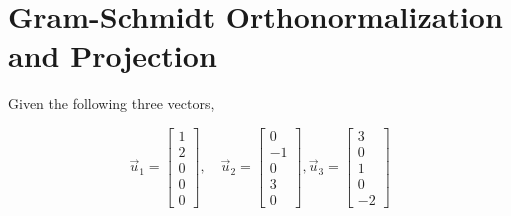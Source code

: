 \pagebreak
\pagestyle{fancy}
\restoregeometry
\section{Gram-Schmidt Orthonormalization and Projection}

Given the following three vectors,

\begin{equation*}
    \vec{u}_1 = \begin{bmatrix} 1\\ 2\\ 0\\ 0\\ 0\end{bmatrix},\quad \vec{u}_2 = \begin{bmatrix} 0\\ -1\\ 0\\ 3\\ 0\end{bmatrix}, \vec{u}_3 = \begin{bmatrix} 3\\ 0\\ 1\\ 0\\ -2\end{bmatrix}
\end{equation*}


